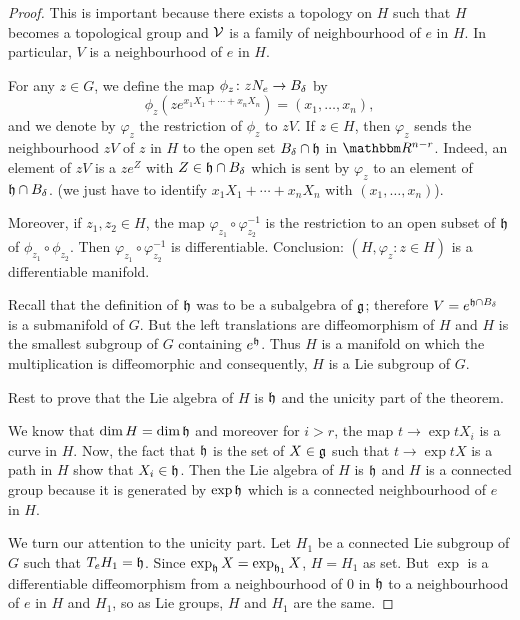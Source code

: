 \begin{proof}
This is important because there exists a topology on $H$ such that $H$ becomes a topological group and $\mathcal{V}$ is a family of neighbourhood of $e$ in $H$. In particular, $V$ is a neighbourhood of $e$ in $H$.

For any $z\in G$, we define the map $\phi_z\colon zN_e\to B_{\delta}$ by
\begin{equation}
  \phi_z(ze^{x_1X_1+\cdots+x_nX_n})=(x_1,\ldots,x_n),
\end{equation}
and we denote by $\varphi_z$ the restriction of $\phi_z$ to $zV$. If $z\in H$, then $\varphi_z$ sends the neighbourhood $zV$ of $z$ in $H$ to the open set $B_{\delta}\cap\mathfrak{h}$ in $\eR^{n-r}$. Indeed, an element of $zV$ is a $ze^Z$ with $Z\in\mathfrak{h}\cap B_{\delta}$ which is sent by $\varphi_z$ to an element of $\mathfrak{h}\cap B_{\delta}$. (we just have to identify $x_1X_1+\cdots+x_nX_n$ with $(x_1,\ldots,x_n)$).

Moreover, if $z_1,z_2\in H$, the map $\varphi_{z_1}\circ\varphi_{z_2}^{-1}$ is the restriction to an open subset of $\mathfrak{h}$ of $\phi_{z_1}\circ\phi_{z_2}$. Then $\varphi_{z_1}\circ\varphi_{z_2}^{-1}$ is differentiable. Conclusion: $(H,\varphi_z: z\in H)$ is a differentiable manifold.

Recall that the definition of $\mathfrak{h}$ was to be a subalgebra of $\mathfrak{g}$; therefore $V=e^{\mathfrak{h}\cap B_{\delta}}$ is a submanifold of $G$. But the left translations are diffeomorphism of $H$ and $H$ is the smallest subgroup of $G$ containing $e^{\mathfrak{h}}$. Thus $H$ is a manifold on which the multiplication is diffeomorphic and consequently, $H$ is a Lie subgroup of $G$.

Rest to prove that the Lie algebra of $H$ is $\mathfrak{h}$ and the unicity part of the theorem.

We know that $\dim H=\dim\mathfrak{h}$ and moreover for $i>r$, the map $t\to\exp tX_i$ is a curve in $H$. Now, the fact that $\mathfrak{h}$ is the set of $X\in\mathfrak{g}$ such that $t\to\exp tX$ is a path in $H$ show that $X_i\in\mathfrak{h}$. Then the Lie algebra of $H$ is $\mathfrak{h}$ and $H$ is a connected group because it is generated by $\exp\mathfrak{h}$ which is a connected neighbourhood of $e$ in $H$.

We turn our attention to the unicity part. Let $H_1$ be a connected Lie subgroup of $G$ such that $T_eH_1=\mathfrak{h}$. Since $\exp_{\mathfrak{h}}X=\exp_{\mathfrak{h}_1}X$, $H=H_1$ as set. But $\exp$ is a differentiable diffeomorphism from a neighbourhood of $0$ in $\mathfrak{h}$ to a neighbourhood of $e$ in $H$ and $H_1$, so as Lie groups, $H$ and $H_1$ are the same.


\end{proof}

